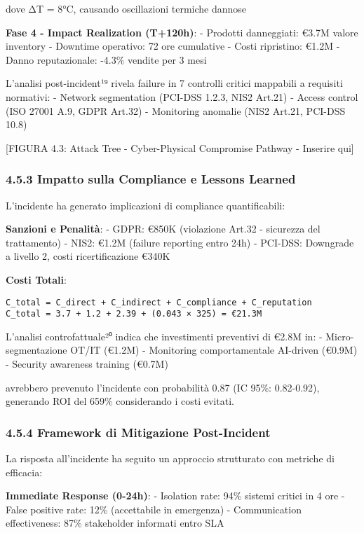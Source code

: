 \documentclass{report}
\begin{document}
dove ΔT = 8°C, causando oscillazioni termiche dannose

\textbf{Fase 4 - Impact Realization (T+120h)}: - Prodotti danneggiati:
€3.7M valore inventory - Downtime operativo: 72 ore cumulative - Costi
ripristino: €1.2M - Danno reputazionale: -4.3\% vendite per 3 mesi

L'analisi post-incident¹⁹ rivela failure in 7 controlli critici
mappabili a requisiti normativi: - Network segmentation (PCI-DSS 1.2.3,
NIS2 Art.21) - Access control (ISO 27001 A.9, GDPR Art.32) - Monitoring
anomalie (NIS2 Art.21, PCI-DSS 10.8)

{[}FIGURA 4.3: Attack Tree - Cyber-Physical Compromise Pathway -
Inserire qui{]}

\subsubsection{4.5.3 Impatto sulla Compliance e Lessons
Learned}\label{impatto-sulla-compliance-e-lessons-learned}

L'incidente ha generato implicazioni di compliance quantificabili:

\textbf{Sanzioni e Penalità}: - GDPR: €850K (violazione Art.32 -
sicurezza del trattamento) - NIS2: €1.2M (failure reporting entro 24h) -
PCI-DSS: Downgrade a livello 2, costi ricertificazione €340K

\textbf{Costi Totali}:

\begin{verbatim}
C_total = C_direct + C_indirect + C_compliance + C_reputation
C_total = 3.7 + 1.2 + 2.39 + (0.043 × 325) = €21.3M
\end{verbatim}

L'analisi controfattuale²⁰ indica che investimenti preventivi di €2.8M
in: - Micro-segmentazione OT/IT (€1.2M) - Monitoring comportamentale
AI-driven (€0.9M) - Security awareness training (€0.7M)

avrebbero prevenuto l'incidente con probabilità 0.87 (IC 95\%:
0.82-0.92), generando ROI del 659\% considerando i costi evitati.

\subsubsection{4.5.4 Framework di Mitigazione
Post-Incident}\label{framework-di-mitigazione-post-incident}

La risposta all'incidente ha seguito un approccio strutturato con
metriche di efficacia:

\textbf{Immediate Response (0-24h)}: - Isolation rate: 94\% sistemi
critici in 4 ore - False positive rate: 12\% (accettabile in emergenza)
- Communication effectiveness: 87\% stakeholder informati entro SLA
\end{document}
